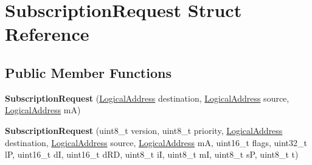\hypertarget{structSubscriptionRequest}{}\section{Subscription\+Request Struct Reference}
\label{structSubscriptionRequest}
\subsection*{Public Member Functions}
\begin{DoxyCompactItemize}
\item 
\mbox{\label{structSubscriptionRequest_a3b6895bbe1f616836913b7681b87a852}} 
{\bfseries Subscription\+Request} (\hyperlink{structLogicalAddress}{Logical\+Address} destination, \hyperlink{structLogicalAddress}{Logical\+Address} source, \hyperlink{structLogicalAddress}{Logical\+Address} mA)
\item 
\mbox{\label{structSubscriptionRequest_a1fb7f2d417847d7df52ce23d00f632a6}} 
{\bfseries Subscription\+Request} (uint8\+\_\+t version, uint8\+\_\+t priority, \hyperlink{structLogicalAddress}{Logical\+Address} destination, \hyperlink{structLogicalAddress}{Logical\+Address} source, \hyperlink{structLogicalAddress}{Logical\+Address} mA, uint16\+\_\+t flags, uint32\+\_\+t lP, uint16\+\_\+t dI, uint16\+\_\+t d\+RD, uint8\+\_\+t iI, uint8\+\_\+t mI, uint8\+\_\+t sP, uint8\+\_\+t t)
\end{DoxyCompactItemize}
